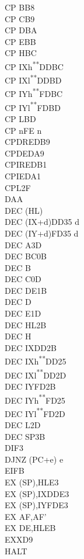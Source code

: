 \documentclass[12pt,twoside,openright,a4paper]{book}
\newcommand{\UNDOC}{\textnormal{\textsuperscript{**}}}
\begin{document}
\begin{multicols}{3}
{\begin{tabbing}
	CP B\>B8\\
	CP C\>B9\\
	CP D\>BA\\
	CP E\>BB\\
	CP H\>BC\\
	CP IXh\UNDOC\>DDBC\\
	CP IXl\UNDOC\>DDBD\\
	CP IYh\UNDOC\>FDBC\\
	CP IYl\UNDOC\>FDBD\\
	CP L\>BD\\
	CP n\>FE n\\
	CPDR\>EDB9\\
	CPD\>EDA9\\
	CPIR\>EDB1\\
	CPI\>EDA1\\
	CPL\>2F\\
	DAA\\
	DEC (HL)\\
	DEC (IX+d)\>DD35 d\\
	DEC (IY+d)\>FD35 d\\
	DEC A\>3D\\
	DEC BC\>0B\\
	DEC B\\
	DEC C\>0D\\
	DEC DE\>1B\\
	DEC D\\
	DEC E\>1D\\
	DEC HL\>2B\\
	DEC H\\
	DEC IX\>DD2B\\
	DEC IXh\UNDOC\>DD25\\
	DEC IXl\UNDOC\>DD2D\\
	DEC IY\>FD2B\\
	DEC IYh\UNDOC\>FD25\\
	DEC IYl\UNDOC\>FD2D\\
	DEC L\>2D\\
	DEC SP\>3B\\
	DI\>F3\\
	DJNZ (PC+e) e\\
	EI\>FB\\
	EX (SP),HL\>E3\\
	EX (SP),IX\>DDE3\\
	EX (SP),IY\>FDE3\\
	EX AF,AF'\\
	EX DE,HL\>EB\\
	EXX\>D9\\
	HALT\\

\end{tabbing}}
\end{multicols}
\end{document}
